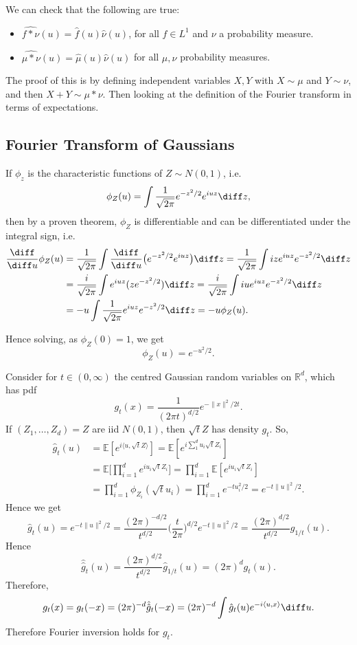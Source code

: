 \documentclass[12pt]{article}
\begin{document}
We can check that the following are true:
\begin{itemize}
	\item $\widehat{f \ast \nu}(u) = \hat f(u) \hat \nu(u)$, for all $f \in L^1$ and $\nu$ a probability measure.
	\item $\widehat{\mu \ast \nu}(u) = \hat \mu (u) \hat \nu(u)$ for all $\mu, \nu$ probability measures.
\end{itemize}
The proof of this is by defining independent variables $X, Y$ with $X \sim \mu$ and $Y \sim \nu$, and then $X + Y \sim \mu \ast \nu$. Then looking at the definition of the Fourier transform in terms of expectations.

\subsection{Fourier Transform of Gaussians}
\label{sub:ft_gauss}

If $\phi_z$ is the characteristic functions of $Z \sim N(0, 1)$, i.e.
\[
	\phi_Z(u) = \int \frac{1}{\sqrt{2\pi}} e^{-z^2/2} e^{iuz}\diff z,
\]
then by a proven theorem, $\phi_Z$ is differentiable and can be differentiated under the integral sign, i.e.
\begin{align*}
	\frac{\diff}{\diff u} \phi_Z(u) &= \frac{1}{\sqrt{2\pi}} \int \frac{\diff}{\diff u} \bigl( e^{-z^2/2} e^{iuz}\bigr)\diff z = \frac{1}{\sqrt{2\pi}} \int i z e^{i u z} e^{-z^2/2} \diff z \\
					&= \frac{i}{\sqrt{2\pi}} \int e^{iuz} (z e^{-z^2/2}) \diff z = \frac{i}{\sqrt{2\pi}} \int i u e^{iuz} e^{-z^2/2}\diff z \\
					&= -u \int \frac{1}{\sqrt{2 \pi}} e^{iuz} e^{-z^2/2} \diff z = -u \phi_Z(u).
\end{align*}

Hence solving, as $\phi_Z(0) = 1$, we get
\[
\phi_Z(u) = e^{-u^2/2}.
\]

Consider for $t \in (0, \infty)$ the centred Gaussian random variables on $\mathbb{R}^{d}$, which has pdf
\[
g_t(x) = \frac{1}{(2 \pi t)^{d/2}} e^{-\|x\|^2/2t}.
\]
If $(Z_1, \ldots, Z_d) = Z$ are iid $N(0,1)$, then $\sqrt t Z$ has density $g_t$. So,
\begin{align*}
	\hat g_t(u) &= \mathbb{E}[e^{i \langle u, \sqrt t Z \rangle}] = \mathbb{E}[e^{i \sum_{1}^{d} u_i \sqrt t Z_i}] \\
		    &= \mathbb{E}\Biggl[\prod_{i = 1}^{d} e^{i u_i \sqrt t Z_i}\Biggr] = \prod_{i= 1}^{d} \mathbb{E}[e^{i u_i \sqrt t Z_i}] \\
		    &= \prod_{i = 1}^{d} \phi_{Z_i}(\sqrt t u_i) = \prod_{i = 1}^{d} e^{-t u_i^2/2} = e^{-t \|u\|^2/2}.
\end{align*}
Hence we get
\[
	\hat g_t(u) = e^{-t \|u\|^2/2} = \frac{(2\pi)^{-d/2}}{t^{d/2}} \biggl( \frac{t}{2 \pi} \biggr)^{d/2} e^{-t \|u\|^2/2} = \frac{(2\pi)^{d/2}}{t^{d/2}} g_{1/t}(u).
\]
Hence
\[
	\hat{\hat{g}}_t(u) = \frac{(2 \pi)^{d/2}}{t^{d/2}} \hat g_{1/t}(u) = (2\pi)^{d}g_t(u).
\]
Therefore,
\[
	g_t(x) = g_t(-x) = (2\pi)^{-d} \hat{\hat{g}}_t(-x) = (2\pi)^{-d}\int \hat g_t(u) e^{-i \langle u, x\rangle} \diff u.
\]
Therefore Fourier inversion holds for $g_t$.
\end{document}
